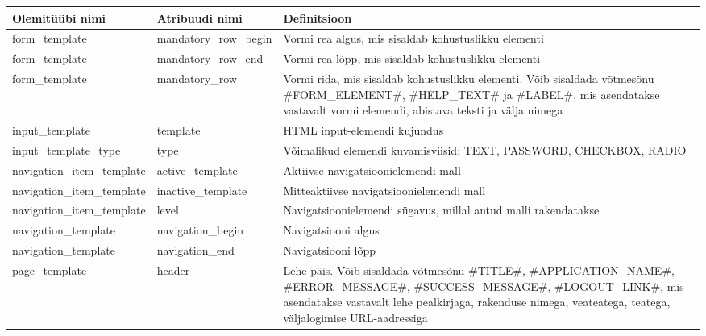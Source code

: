 \documentclass[a4paper,12pt]{article} %
\begin{document}
\begin{table}[H]
\centering
\begin{tabular}{|p{5cm}|p{5cm}|p{5cm}|}
\hline
\rowcolor{rowgray}
Olemitüübi nimi & Atribuudi nimi & Definitsioon \\ \hline
form\_template & mandatory\_row\_begin & Vormi rea algus, mis sisaldab kohustuslikku elementi \\ \hline
form\_template & mandatory\_row\_end & Vormi rea lõpp, mis sisaldab kohustuslikku elementi \\ \hline
form\_template & mandatory\_row & Vormi rida, mis sisaldab kohustuslikku elementi. Võib sisaldada võtmesõnu \#FORM\_ELEMENT\#, \#HELP\_TEXT\# ja \#LABEL\#, mis asendatakse vastavalt vormi elemendi, abistava teksti ja välja nimega \\ \hline
input\_template & template & HTML input-elemendi kujundus \\ \hline
input\_template\_type & type & Võimalikud elemendi kuvamisviisid: TEXT, PASSWORD, CHECKBOX, RADIO \\ \hline
navigation\_item\_template & active\_template & Aktiivse navigatsioonielemendi mall \\ \hline
navigation\_item\_template & inactive\_template & Mitteaktiivse navigatsioonielemendi mall \\ \hline
navigation\_item\_template & level & Navigatsioonielemendi sügavus, millal antud malli rakendatakse \\ \hline
navigation\_template & navigation\_begin & Navigatsiooni algus \\ \hline
navigation\_template & navigation\_end & Navigatsiooni lõpp \\ \hline
page\_template & header & Lehe päis. Võib sisaldada võtmesõnu \#TITLE\#, \#APPLICATION\_NAME\#, \#ERROR\_MESSAGE\#, \#SUCCESS\_MESSAGE\#, \#LOGOUT\_LINK\#, mis asendatakse vastavalt lehe pealkirjaga, rakenduse nimega, veateatega, teatega, väljalogimise URL-aadressiga \\ \hline
\end{tabular}
\end{table}
\end{document}
